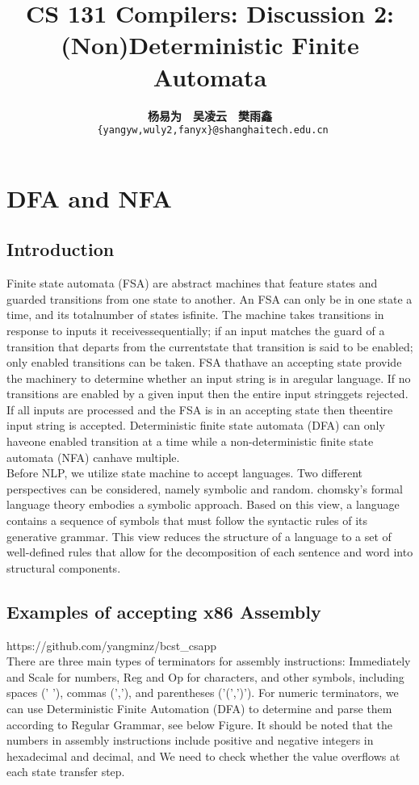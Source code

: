 \documentclass[a4paper]{exam}
\title{CS 131 Compilers: Discussion 2: (Non)Deterministic Finite Automata}
\author{\textbf{杨易为}~~\textbf{吴凌云}~~\textbf{樊雨鑫} \\ \texttt{ \{yangyw,wuly2,fanyx\}@shanghaitech.edu.cn}}
\begin{document}
\maketitle
\section{DFA and NFA}
\subsection{Introduction}

Finite state automata (FSA) are abstract machines that feature states and guarded transitions from one state to another. An FSA can only be in one state a time, and its totalnumber of states isfinite.  The machine takes transitions in response to inputs it receivessequentially;  if an input matches the guard of a transition that departs from the currentstate that transition is said to be enabled; only enabled transitions can be taken.  FSA thathave an accepting state provide the machinery to determine whether an input string is in aregular language.  If no transitions are enabled by a given input then the entire input stringgets  rejected.   If  all  inputs  are  processed  and  the  FSA  is  in  an  accepting  state  then  theentire input string is accepted.  Deterministic finite state automata (DFA) can only haveone enabled transition at a time while a non-deterministic finite state automata (NFA) canhave multiple.
\\
Before NLP, we utilize state machine to accept languages. Two different perspectives can be considered, namely symbolic and random. chomsky's formal language theory embodies a symbolic approach. Based on this view, a language contains a sequence of symbols that must follow the syntactic rules of its generative grammar. This view reduces the structure of a language to a set of well-defined rules that allow for the decomposition of each sentence and word into structural components.
\subsection{Examples of accepting x86 Assembly}
https://github.com/yangminz/bcst\_csapp
\\
There are three main types of terminators for assembly instructions: Immediately and Scale for numbers, Reg and Op for characters, and other symbols, including spaces (' '), commas (','), and parentheses ('(',')'). For numeric terminators, we can use Deterministic Finite Automation (DFA) to determine and parse them according to Regular Grammar, see below Figure. It should be noted that the numbers in assembly instructions include positive and negative integers in hexadecimal and decimal, and We need to check whether the value overflows at each state transfer step.
\end{document}
